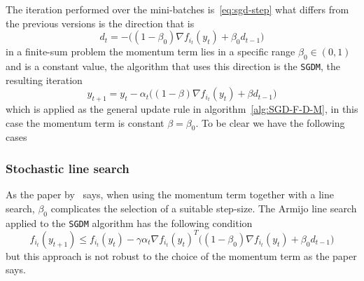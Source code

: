 The iteration performed over the mini-batches is~\eqref{eq:sgd-step} what differs from the previous versions is the direction that is
\[
d_t=-\bigl((1-\beta_0)\nabla f_{i_t}(y_t)+\beta_0d_{t-1}\bigr)
\]
in a finite-sum problem the momentum term lies in a specific range $\beta_0\in(0,1)$ and is a constant value, the algorithm that uses this direction is the \texttt{SGDM}, the resulting iteration
\begin{equation}\label{eq:sgdm-step}
y_{t+1}=y_t-\alpha_t\bigl((1-\beta)\nabla f_{i_t}(y_t)+\beta d_{t-1}\bigr)
\end{equation}
which is applied as the general update rule in algorithm~\vref{alg:SGD-F-D-M}, in this case the momentum term is constant $\beta=\beta_0$. To be clear we have the following cases
\begin{center}
\end{center}

\subsubsection{Stochastic line search}

As the paper by~\textcite{fan_msl_2023} says, when using the momentum term together with a line search, $\beta_0$ complicates the selection of a suitable step-size. The Armijo line search applied to the \texttt{SGDM} algorithm has the following condition
\begin{equation}\label{eq:armijo-sgdm}
f_{i_t}(y_{t+1})\leq f_{i_t}(y_t)-\gamma\alpha_t\nabla f_{i_t}(y_t)^T\bigl((1-\beta_0)\nabla f_{i_t}(y_t)+\beta_0d_{t-1}\bigr)
\end{equation}
but this approach is not robust to the choice of the momentum term as the paper says.

